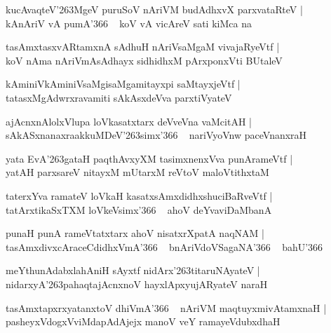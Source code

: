 \documentclass[twoside,12pt,openright]{book}
\def\S{\char'263}
\newcounter{shloka}[chapter]
\begin{document}
\begin{shloka}
kucAvaqteV\S MgeV puruSoV nAriVM budAdhxvX parxvataRteV |\\
kAnAriV vA pumA\char'366 ~ koV vA vicAreV sati kiMca na 
\end{shloka}

\begin{shloka}
tasAmxtasxvARtamxnA sAdhuH nAriVsaMgaM vivajaRyeVtf |\\
koV nAma nAriVmAsAdhayx sidhidhxM pArxponxVti BUtaleV 
\end{shloka}

\begin{shloka}
kAminiVkAminiVsaMgisaMgamitayxpi saMtayxjeVtf |\\
tatasxMgAdwrxravamiti sAkAsxdeVva parxtiVyateV 
\end{shloka}

\begin{shloka}
ajAcnxnAlolxVlupa loVkasatxtarx deVveVna vaMcitAH |\\
sAkASxnanaxraakkuMDeV\S simx\char'366  ~ nariVyoVnw paceVnanxraH
\end{shloka}

\begin{shloka}
yata EvA\S gataH paqthAvxyXM  tasimxnenxVva punArameVtf |\\
yatAH parxsareV nitayxM  mUtarxM reVtoV maloVtithxtaM 
\end{shloka}

\begin{shloka}
taterxYva ramateV loVkaH kasatxsAmxdidhxshuciBaRveVtf |\\
tatArxtikaSxTXM loVkeVsimx\char'366 ~ ahoV deYvaviDaMbanA 
\end{shloka}

\begin{shloka}
punaH punA rameVtatxtarx ahoV nisatxrXpatA naqNAM |\\
tasAmxdivxcAraceCdidhxVmA\char'366 ~ bnAriVdoVSagaNA\char'366 ~ bahU\char'366
\end{shloka}

\begin{shloka}
meYthunAdabxlahAniH sAyxtf nidArx\S titaruNAyateV |\\
nidarxyA\S pahaqtajAcnxnoV hayxlApxyujARyateV naraH 
\end{shloka}

\begin{shloka}
tasAmxtapxrxyatanxtoV dhiVmA\char'366 ~ nAriVM maqtuyxmivAtamxnaH |\\
pasheyxVdogxVviMdapAdAjejx manoV veY ramayeVdubxdhaH 
\end{shloka}
\end{document}
